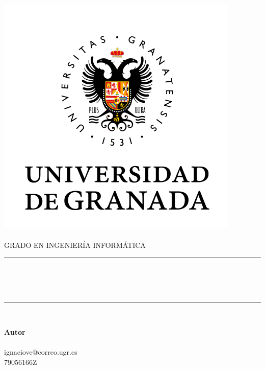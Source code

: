 \begin{titlepage}
    \begin{minipage}{\textwidth}
        \centering

        \includegraphics[scale=0.5]{img/ugr.png}\\

        \textsc{\Large \asignatura{}\\[0.2cm]}
        \textsc{GRADO EN INGENIERÍA INFORMÁTICA}\\[1cm]

        \noindent\rule[-1ex]{\textwidth}{1pt}\\[1.5ex]
        \textsc{{\Huge \titulo\\[0.5ex]}}
        \textsc{{\Large \subtitulo\\}}
        \noindent\rule[-1ex]{\textwidth}{2pt}\\[2.5ex]

        \end{minipage}

        \vspace{0.3cm}

        \begin{minipage}{\textwidth}

        \centering

        \textbf{Autor}\\ {\autor{} \\ ignaciove@correo.ugr.es \\ 79056166Z}\\[1.5ex]
        \vspace{0.2cm}


\end{minipage}
\end{titlepage}
